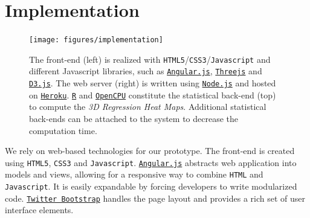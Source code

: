 \documentclass[journal]{style/vgtc} 			          %
\begin{document}
\section{Implementation} \label{implementation}
\begin{figure}[htb]
 \centering
 \texttt{[image: figures/implementation]}
 \caption{
 The front-end (left) is realized with \texttt{HTML5}/\texttt{CSS3}/\texttt{Javascript} and different Javascript libraries, such as \href{https://www.angularjs.org/}{\texttt{Angular.js}}, \href{http://threejs.org}{\texttt{Threejs}} and \href{http://d3js.org/}{\texttt{D3.js}}.
 The web server (right) is written using \href{http://nodejs.org}{\texttt{Node.js}} and hosted on \href{https://www.heroku.com/}{\texttt{Heroku}}.
 \href{http://r-project.org}{\texttt{R}} and \href{https://www.opencpu.org/}{\texttt{OpenCPU}} constitute the statistical back-end (top) to compute the \emph{3D Regression Heat Maps}.
 Additional statistical back-ends can be attached to the system to decrease the computation time.
 }
  \label{fig:Implementation}
\end{figure}
\noindent We rely on web-based technologies for our prototype.
The front-end is created using \texttt{HTML5}, \texttt{CSS3} and \texttt{Javascript}.
\href{https://www.angularjs.org/}{\texttt{Angular.js}} abstracts web application into models and views, allowing for a responsive way to combine \texttt{HTML} and \texttt{Javascript}.
It is easily expandable by forcing developers to write modularized code.
\href{http://getbootstrap.com}{\texttt{Twitter Bootstrap}} handles the page layout and provides a rich set of user interface elements.
\end{document}
